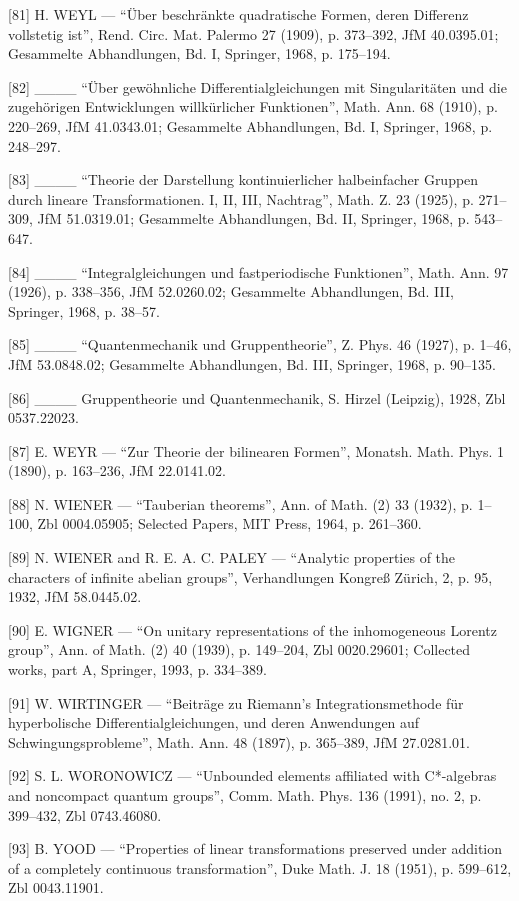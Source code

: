 {[}81{]} H. WEYL — “Über beschränkte quadratische Formen, deren Differenz vollstetig ist”, Rend. Circ. Mat. Palermo 27 (1909), p. 373–392, JfM 40.0395.01; Gesammelte Abhandlungen, Bd. I, Springer, 1968, p. 175–194.

{[}82{]} \_\_\_\_ “Über gewöhnliche Differentialgleichungen mit Singularitäten und die zugehörigen Entwicklungen willkürlicher Funktionen”, Math. Ann. 68 (1910), p. 220–269, JfM 41.0343.01; Gesammelte Abhandlungen, Bd. I, Springer, 1968, p. 248–297.

{[}83{]} \_\_\_\_ “Theorie der Darstellung kontinuierlicher halbeinfacher Gruppen durch lineare Transformationen. I, II, III, Nachtrag”, Math. Z. 23 (1925), p. 271–309, JfM 51.0319.01; Gesammelte Abhandlungen, Bd. II, Springer, 1968, p. 543–647.

{[}84{]} \_\_\_\_ “Integralgleichungen und fastperiodische Funktionen”, Math. Ann. 97 (1926), p. 338–356, JfM 52.0260.02; Gesammelte Abhandlungen, Bd. III, Springer, 1968, p. 38–57.

{[}85{]} \_\_\_\_ “Quantenmechanik und Gruppentheorie”, Z. Phys. 46 (1927), p. 1–46, JfM 53.0848.02; Gesammelte Abhandlungen, Bd. III, Springer, 1968, p. 90–135.

{[}86{]} \_\_\_\_ Gruppentheorie und Quantenmechanik, S. Hirzel (Leipzig), 1928, Zbl 0537.22023.

{[}87{]} E. WEYR — “Zur Theorie der bilinearen Formen”, Monatsh. Math. Phys. 1 (1890), p. 163–236, JfM 22.0141.02.

{[}88{]} N. WIENER — “Tauberian theorems”, Ann. of Math. (2) 33 (1932), p. 1–100, Zbl 0004.05905; Selected Papers, MIT Press, 1964, p. 261–360.

{[}89{]} N. WIENER and R. E. A. C. PALEY — “Analytic properties of the characters of infinite abelian groups”, Verhandlungen Kongreß Zürich, 2, p. 95, 1932, JfM 58.0445.02.

{[}90{]} E. WIGNER — “On unitary representations of the inhomogeneous Lorentz group”, Ann. of Math. (2) 40 (1939), p. 149–204, Zbl 0020.29601; Collected works, part A, Springer, 1993, p. 334–389.

{[}91{]} W. WIRTINGER — “Beiträge zu Riemann's Integrationsmethode für hyperbolische Differentialgleichungen, und deren Anwendungen auf Schwingungsprobleme”, Math. Ann. 48 (1897), p. 365–389, JfM 27.0281.01.

{[}92{]} S. L. WORONOWICZ — “Unbounded elements affiliated with C*-algebras and noncompact quantum groups”, Comm. Math. Phys. 136 (1991), no. 2, p. 399–432, Zbl 0743.46080.

{[}93{]} B. YOOD — “Properties of linear transformations preserved under addition of a completely continuous transformation”, Duke Math. J. 18 (1951), p. 599–612, Zbl 0043.11901.

